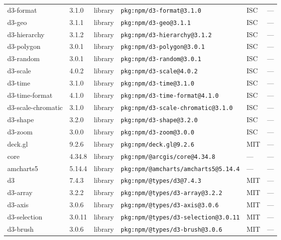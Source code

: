 \documentclass[11pt,a4paper]{article}
\begin{document}
\begin{longtable}{|p{4cm}|p{2cm}|p{1.6cm}|p{5cm}|p{1.5cm}|p{3.5cm}|}
\raggedright d3-format & 3.1.0 & library & \small\texttt{pkg:npm/d3-format@3.1.0} & ISC & \small — \\
\raggedright d3-geo & 3.1.1 & library & \small\texttt{pkg:npm/d3-geo@3.1.1} & ISC & \small — \\
\raggedright d3-hierarchy & 3.1.2 & library & \small\texttt{pkg:npm/d3-hierarchy@3.1.2} & ISC & \small — \\
\raggedright d3-polygon & 3.0.1 & library & \small\texttt{pkg:npm/d3-polygon@3.0.1} & ISC & \small — \\
\raggedright d3-random & 3.0.1 & library & \small\texttt{pkg:npm/d3-random@3.0.1} & ISC & \small — \\
\raggedright d3-scale & 4.0.2 & library & \small\texttt{pkg:npm/d3-scale@4.0.2} & ISC & \small — \\
\raggedright d3-time & 3.1.0 & library & \small\texttt{pkg:npm/d3-time@3.1.0} & ISC & \small — \\
\raggedright d3-time-format & 4.1.0 & library & \small\texttt{pkg:npm/d3-time-format@4.1.0} & ISC & \small — \\
\raggedright d3-scale-chromatic & 3.1.0 & library & \small\texttt{pkg:npm/d3-scale-chromatic@3.1.0} & ISC & \small — \\
\raggedright d3-shape & 3.2.0 & library & \small\texttt{pkg:npm/d3-shape@3.2.0} & ISC & \small — \\
\raggedright d3-zoom & 3.0.0 & library & \small\texttt{pkg:npm/d3-zoom@3.0.0} & ISC & \small — \\
\raggedright deck.gl & 9.2.6 & library & \small\texttt{pkg:npm/deck.gl@9.2.6} & MIT & \small — \\
\raggedright core & 4.34.8 & library & \small\texttt{pkg:npm/@arcgis/core@4.34.8} & — & \small — \\
\raggedright amcharts5 & 5.14.4 & library & \small\texttt{pkg:npm/@amcharts/amcharts5@5.14.4} & — & \small — \\
\raggedright d3 & 7.4.3 & library & \small\texttt{pkg:npm/@types/d3@7.4.3} & MIT & \small — \\
\raggedright d3-array & 3.2.2 & library & \small\texttt{pkg:npm/@types/d3-array@3.2.2} & MIT & \small — \\
\raggedright d3-axis & 3.0.6 & library & \small\texttt{pkg:npm/@types/d3-axis@3.0.6} & MIT & \small — \\
\raggedright d3-selection & 3.0.11 & library & \small\texttt{pkg:npm/@types/d3-selection@3.0.11} & MIT & \small — \\
\raggedright d3-brush & 3.0.6 & library & \small\texttt{pkg:npm/@types/d3-brush@3.0.6} & MIT & \small — \\

\end{longtable}
\end{document}
